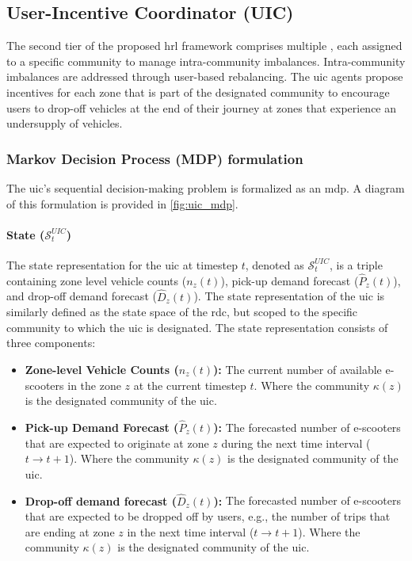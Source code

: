 \subsection{User-Incentive Coordinator (UIC)}\label{sec:design-rl_framework-uic}
The second tier of the proposed \gls{hrl} framework comprises multiple , each assigned to a specific community to manage intra-community imbalances.
Intra-community imbalances are addressed through user-based rebalancing.
The \gls{uic} agents propose incentives for each zone that is part of the designated community to encourage users to drop-off vehicles at the end of their journey at zones that experience an undersupply of vehicles.


\subsubsection{Markov Decision Process (MDP) formulation}
The \gls{uic}'s sequential decision-making problem is formalized as an \gls{mdp}.
A diagram of this formulation is provided in \autoref{fig:uic_mdp}.

\paragraph{State ($\mathcal{S}^{UIC}_t$)}
The state representation for the \gls{uic} at timestep $t$, denoted as $\mathcal{S}^{UIC}_t$, is a triple containing zone level vehicle counts ($n_z(t)$), pick-up demand forecast ($\hat{P}_z(t)$), and drop-off demand forecast ($\hat{D}_z(t)$).
The state representation of the \gls{uic} is similarly defined as the state space of the \gls{rdc}, but scoped to the specific community to which the \gls{uic} is designated.
The state representation consists of three components:

\begin{itemize}
    \item \textbf{Zone-level Vehicle Counts ($n_z(t)$):}
    The current number of available e-scooters in the zone $z$ at the current timestep $t$. Where the community $\kappa(z)$ is the designated community of the \gls{uic}.
    \item \textbf{Pick-up Demand Forecast ($\hat{P}_z(t)$):}
    The forecasted number of e-scooters that are expected to originate at zone $z$ during the next time interval ($t \to t+1$). Where the community $\kappa(z)$ is the designated community of the \gls{uic}.
    \item \textbf{Drop-off demand forecast ($\hat{D}_z(t)$):}
    The forecasted number of e-scooters that are expected to be dropped off by users, e.g., the number of trips that are ending at zone $z$ in the next time interval ($t \to t+1$). Where the community $\kappa(z)$ is the designated community of the \gls{uic}.
\end{itemize}

